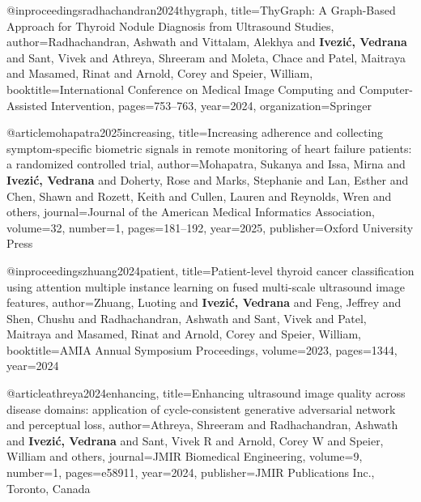 @inproceedings{radhachandran2024thygraph,
  title={ThyGraph: A Graph-Based Approach for Thyroid Nodule Diagnosis from Ultrasound Studies},
  author={Radhachandran, Ashwath and Vittalam, Alekhya and {\textbf{Ivezi{\'c}, Vedrana}} and Sant, Vivek and Athreya, Shreeram and Moleta, Chace and Patel, Maitraya and Masamed, Rinat and Arnold, Corey and Speier, William},
  booktitle={International Conference on Medical Image Computing and Computer-Assisted Intervention},
  pages={753--763},
  year={2024},
  organization={Springer}
}

@article{mohapatra2025increasing,
  title={Increasing adherence and collecting symptom-specific biometric signals in remote monitoring of heart failure patients: a randomized controlled trial},
  author={Mohapatra, Sukanya and Issa, Mirna and {\textbf{Ivezi{\'c}, Vedrana}} and Doherty, Rose and Marks, Stephanie and Lan, Esther and Chen, Shawn and Rozett, Keith and Cullen, Lauren and Reynolds, Wren and others},
  journal={Journal of the American Medical Informatics Association},
  volume={32},
  number={1},
  pages={181--192},
  year={2025},
  publisher={Oxford University Press}
}

@inproceedings{zhuang2024patient,
  title={Patient-level thyroid cancer classification using attention multiple instance learning on fused multi-scale ultrasound image features},
  author={Zhuang, Luoting and {\textbf{Ivezi{\'c}, Vedrana}} and Feng, Jeffrey and Shen, Chushu and Radhachandran, Ashwath and Sant, Vivek and Patel, Maitraya and Masamed, Rinat and Arnold, Corey and Speier, William},
  booktitle={AMIA Annual Symposium Proceedings},
  volume={2023},
  pages={1344},
  year={2024}
}

@article{athreya2024enhancing,
  title={Enhancing ultrasound image quality across disease domains: application of cycle-consistent generative adversarial network and perceptual loss},
  author={Athreya, Shreeram and Radhachandran, Ashwath and {\textbf{Ivezi{\'c}, Vedrana}} and Sant, Vivek R and Arnold, Corey W and Speier, William and others},
  journal={JMIR Biomedical Engineering},
  volume={9},
  number={1},
  pages={e58911},
  year={2024},
  publisher={JMIR Publications Inc., Toronto, Canada}
}